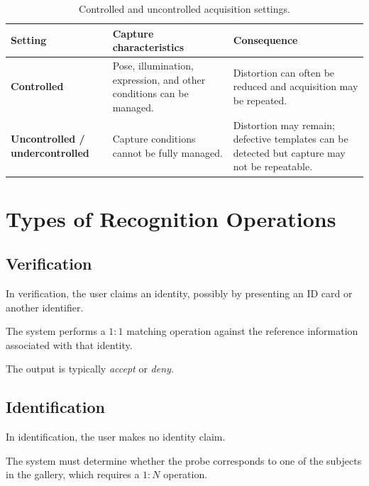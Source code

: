 \documentclass[11pt,a4paper,oneside]{report}
\begin{document}
\begin{table}[H]
\centering
\caption{Controlled and uncontrolled acquisition settings.}
\label{tab:controlled-settings}
\small

\begin{tabular}{
    >{\bfseries}P{3.0cm}
    P{5.4cm}
    P{5.4cm}
}
\toprule

Setting &
\textbf{Capture characteristics} &
\textbf{Consequence}
\\

\midrule

Controlled &
Pose, illumination, expression, and other conditions can be managed. &
Distortion can often be reduced and acquisition may be repeated.
\\

Uncontrolled / undercontrolled &
Capture conditions cannot be fully managed. &
Distortion may remain; defective templates can be detected but capture
may not be repeatable.
\\

\bottomrule
\end{tabular}

\end{table}

\section{Types of Recognition Operations}
\label{subsec:operations}

\subsection{Verification}

In verification, the user claims an identity, possibly by presenting an
ID card or another identifier.

The system performs a \(1{:}1\) matching operation against the reference
information associated with that identity.

The output is typically \emph{accept} or \emph{deny}.

\subsection{Identification}

In identification, the user makes no identity claim.

The system must determine whether the probe corresponds to one of the
subjects in the gallery, which requires a \(1{:}N\) operation.
\end{document}
